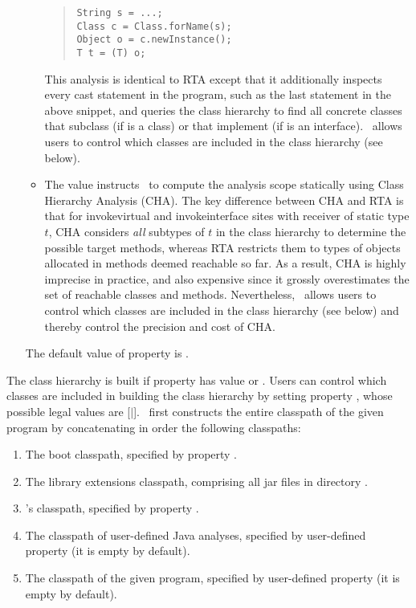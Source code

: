 \begin{itemize}
\begin{itemize}
\begin{quote}
\begin{verbatim}
String s = ...;
Class c = Class.forName(s);
Object o = c.newInstance();
T t = (T) o;
\end{verbatim}
\end{quote}

This analysis is identical to RTA except that it additionally inspects every cast statement in the program,
such as the last statement in the above snippet,
and queries the class hierarchy to find all concrete classes that subclass  (if  is a class)
or that implement  (if  is an interface).
\Chord\ allows users to control which classes are included in the class hierarchy (see below).

\item
The  value instructs \Chord\ to compute the analysis scope statically using Class Hierarchy Analysis (CHA).
The key difference between CHA and RTA is that for invokevirtual and invokeinterface sites with receiver of
static type $t$, CHA considers {\it all} subtypes of $t$ in the class hierarchy to determine the possible
target methods, whereas RTA restricts them to types of objects allocated in methods deemed reachable so far.
As a result, CHA is highly imprecise in practice, and also expensive since it grossly overestimates the set
of reachable classes and methods.
Nevertheless, \Chord\ allows users to control which classes are included in the class hierarchy (see below)
and thereby control the precision and cost of CHA.

\end{itemize}
The default value of property  is .
\end{itemize}

The class hierarchy is built if property  has value  or .
Users can control which classes are included in building the class hierarchy by setting property ,
whose possible legal values are [$|$].
\Chord\ first constructs the entire classpath of the given program by concatenating in order the following
classpaths:

\begin{enumerate}
\item
The boot classpath, specified by property .
\item
The library extensions classpath, comprising all jar files in directory .
\item
\Chord's classpath, specified by property .
\item
The classpath of user-defined Java analyses, specified by user-defined property 
(it is empty by default).
\item
The classpath of the given program, specified by user-defined property 
(it is empty by default).
\end{enumerate}

